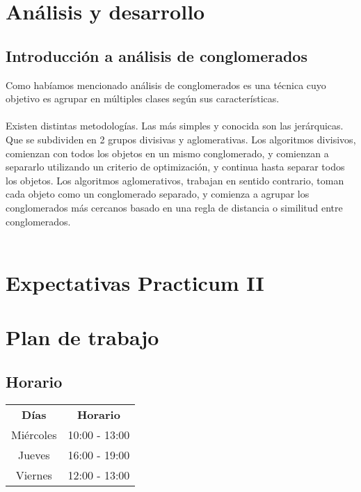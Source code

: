\documentclass[12pt,oneside]{book}
\begin{document}
\chapter{An\'alisis y desarrollo}
\section{Introducci\'on a an\'alisis de conglomerados}
Como hab\'iamos mencionado an\'alisis de conglomerados es una t\'ecnica cuyo objetivo es agrupar en m\'ultiples clases seg\'un sus caracter\'isticas.\\\\
Existen distintas metodolog\'ias. Las m\'as simples y conocida son las jer\'arquicas. Que se subdividen en 2 grupos divisivas y aglomerativas.
Los algoritmos divisivos, comienzan con todos los objetos en un mismo conglomerado, y comienzan a separarlo utilizando un criterio de optimizaci\'on, y continua hasta separar todos los objetos. Los algoritmos aglomerativos, trabajan en sentido contrario, toman cada objeto como un conglomerado separado, y comienza a agrupar los conglomerados m\'as cercanos basado en una regla de distancia o similitud entre conglomerados.\\\\

\chapter{Expectativas Practicum II}

\chapter{Plan de trabajo}
\section{Horario}
\begin{tabular}{ c | c }
  \textbf{D\'ias} & \textbf{Horario} \\
  Mi\'ercoles & 10:00 - 13:00  \\
  Jueves & 16:00 - 19:00  \\
  Viernes & 12:00 - 13:00  \\
\end{tabular}
\end{document}
